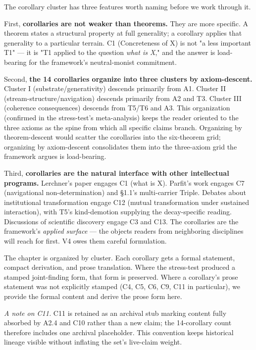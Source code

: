 \documentclass[11pt, openany]{book}
\begin{document}
The corollary cluster has three features worth naming before we work through it.

First, \textbf{corollaries are not weaker than theorems.} They are more specific. A theorem states a structural property at full generality; a corollary applies that generality to a particular terrain. C1 (Concreteness of X) is not "a less important T1" --- it is "T1 applied to the question \textit{what is X}," and the answer is load-bearing for the framework's neutral-monist commitment.

Second, \textbf{the 14 corollaries organize into three clusters by axiom-descent.} Cluster I (substrate/generativity) descends primarily from A1. Cluster II (stream-structure/navigation) descends primarily from A2 and T3. Cluster III (coherence consequences) descends from T5/T6 and A3. This organization (confirmed in the stress-test's meta-analysis) keeps the reader oriented to the three axioms as the spine from which all specific claims branch. Organizing by theorem-descent would scatter the corollaries into the six-theorem grid; organizing by axiom-descent consolidates them into the three-axiom grid the framework argues is load-bearing.

Third, \textbf{corollaries are the natural interface with other intellectual programs.} Lerchner's paper engages C1 (what is X). Parfit's work engages C7 (navigational non-determination) and §1.1's multi-carrier Triple. Debates about institutional transformation engage C12 (mutual transformation under sustained interaction), with T5's kind-demotion supplying the decay-specific reading. Discussions of scientific discovery engage C3 and C13. The corollaries are the framework's \textit{applied surface} --- the objects readers from neighboring disciplines will reach for first. V4 owes them careful formulation.

The chapter is organized by cluster. Each corollary gets a formal statement, compact derivation, and prose translation. Where the stress-test produced a stamped joint-finding form, that form is preserved. Where a corollary's prose statement was not explicitly stamped (C4, C5, C6, C9, C11 in particular), we provide the formal content and derive the prose form here.

\textit{A note on C11.} C11 is retained as an archival stub marking content fully absorbed by A2.4 and C10 rather than a new claim; the 14-corollary count therefore includes one archival placeholder. This convention keeps historical lineage visible without inflating the set's live-claim weight.
\end{document}
